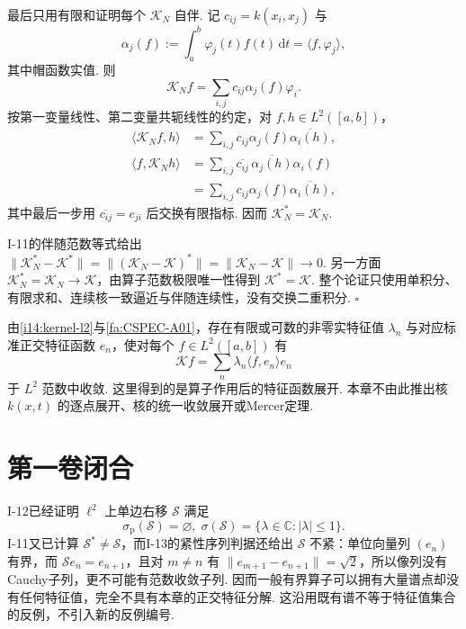 \begin{FAProof}
最后只用有限和证明每个 \(\displaystyle \mathcal K_N\) 自伴. 记 \(\displaystyle c_{ij}=k(x_i,x_j)\) 与
\[
\alpha_j(f)
:=
\int_a^b\varphi_j(t)f(t)\,\mathrm{d}t
=
\langle f,\varphi_j\rangle,
\]
其中帽函数实值. 则
\[
\mathcal K_Nf
=
\sum_{i,j}c_{ij}\alpha_j(f)\varphi_i.
\]
按第一变量线性、第二变量共轭线性的约定，对 \(\displaystyle f,h\in L^2([a,b])\)，
\[
\begin{aligned}
\displaystyle \langle\mathcal K_Nf,h\rangle
&\displaystyle =
\sum_{i,j}c_{ij}\alpha_j(f)\overline{\alpha_i(h)},\\
\displaystyle \langle f,\mathcal K_Nh\rangle
&\displaystyle =
\sum_{i,j}\overline{c_{ij}}\,\overline{\alpha_j(h)}\alpha_i(f)\\
&\displaystyle =
\sum_{i,j}c_{ij}\alpha_j(f)\overline{\alpha_i(h)},
\end{aligned}
\]
其中最后一步用 \(\displaystyle \overline{c_{ij}}=c_{ji}\) 后交换有限指标. 因而 \(\displaystyle \mathcal K_N^*=\mathcal K_N\).

I-11的伴随范数等式给出
\(\displaystyle \|\mathcal K_N^*-\mathcal K^*\| = \|(\mathcal K_N-\mathcal K)^*\| = \|\mathcal K_N-\mathcal K\| \to0\).
另一方面 \(\displaystyle \mathcal K_N^*=\mathcal K_N\to\mathcal K\)，由算子范数极限唯一性得到 \(\displaystyle \mathcal K^*=\mathcal K\). 整个论证只使用单积分、有限求和、连续核一致逼近与伴随连续性，没有交换二重积分.
\hfill\(\square\)
\end{FAProof}

\begin{FAApplication}\label{i14:kernel-spectral-application}
由\autoref{i14:kernel-l2}与\autoref{fa:CSPEC-A01}，存在有限或可数的非零实特征值 \(\displaystyle \lambda_n\) 与对应标准正交特征函数 \(\displaystyle e_n\)，使对每个 \(\displaystyle f\in L^2([a,b])\) 有
\[
\mathcal Kf
=
\sum_n
\lambda_n\langle f,e_n\rangle e_n
\]
于 \(\displaystyle L^2\) 范数中收敛. 这里得到的是算子作用后的特征函数展开. 本章不由此推出核 \(\displaystyle k(x,t)\) 的逐点展开、核的统一收敛展开或Mercer定理.
\end{FAApplication}

\section{第一卷闭合}\label{sec:i14-volume-one-closure}

\begin{FACounterexample}[一般有界算子的边界]
I-12已经证明 \(\displaystyle \ell^2\) 上单边右移 \(\displaystyle \mathcal S\) 满足
\[
\sigma_{\mathrm p}(\mathcal S)
=
\varnothing,
\;
\sigma(\mathcal S)
=
\{\lambda\in\mathbb C:|\lambda|\leqslant1\}.
\]
I-11又已计算 \(\displaystyle \mathcal S^*\neq\mathcal S\)，而I-13的紧性序列判据还给出 \(\displaystyle \mathcal S\) 不紧：单位向量列 \(\displaystyle (e_n)\) 有界，而 \(\displaystyle \mathcal Se_n=e_{n+1}\)，且对 \(\displaystyle m\neq n\) 有 \(\displaystyle \|e_{m+1}-e_{n+1}\|=\sqrt2\)，所以像列没有Cauchy子列，更不可能有范数收敛子列. 因而一般有界算子可以拥有大量谱点却没有任何特征值，完全不具有本章的正交特征分解. 这沿用既有谱不等于特征值集合的反例，不引入新的反例编号.
\end{FACounterexample}

